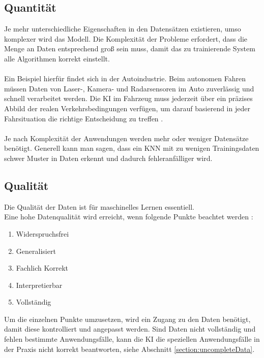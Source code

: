 \documentclass[12pt,oneside,a4paper,parskip]{scrbook}
\begin{document}
\subsection{Quantität}
\label{section:DataQuantity}
Je mehr unterschiedliche Eigenschaften in den Datensätzen existieren, umso komplexer wird das Modell. Die Komplexität der Probleme erfordert, dass die Menge an Daten entsprechend groß sein muss, damit das zu trainierende System alle Algorithmen korrekt einstellt.
\\\\
Ein Beispiel hierfür findet sich in der Autoindustrie. Beim autonomen Fahren müssen Daten von Laser-, Kamera- und Radarsensoren im Auto zuverlässig und schnell verarbeitet werden. Die KI im Fahrzeug muss jederzeit über ein präzises Abbild der realen Verkehrsbedingungen verfügen, um darauf basierend in jeder Fahrsituation die richtige Entscheidung zu treffen \cite{autonomesFahren}.
\\\\
Je nach Komplexität der Anwendungen werden mehr oder weniger Datensätze benötigt. Generell kann man sagen, dass ein KNN mit zu wenigen Trainingsdaten schwer Muster in Daten erkennt und dadurch fehleranfälliger wird.

\subsection{Qualität}
\label{section:DataQuality}

Die Qualität der Daten ist für maschinelles Lernen essentiell. \\Eine hohe Datenqualität wird erreicht, wenn folgende Punkte beachtet werden \cite{goodDataQuality}:
\begin{enumerate}
	\item Widerspruchsfrei
	\item Generalisiert
	\item Fachlich Korrekt
	\item Interpretierbar
	\item Vollständig
\end{enumerate}
Um die einzelnen Punkte umzusetzen, wird ein Zugang zu den Daten benötigt, damit diese kontrolliert und angepasst werden. Sind Daten nicht vollständig und fehlen bestimmte Anwendungsfälle, kann die KI die speziellen Anwendungsfälle in der Praxis nicht korrekt beantworten, siehe Abschnitt \ref{section:uncompleteData}.
\end{document}
